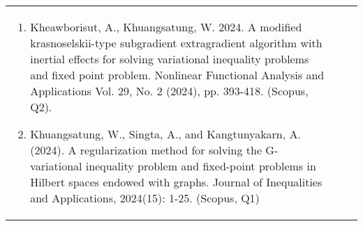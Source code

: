 {\begin{center}
\begin{longtable}{|p{}|p{}|p{}|}
\begin{enumerate}[series=note]
	\item Kheawborisut, A., Khuangsatung, W. 2024. A modified krasnoselskii-type subgradient extragradient algorithm with inertial effects for solving variational inequality problems and fixed point problem. Nonlinear Functional Analysis and Applications Vol. 29, No. 2 (2024), pp. 393-418. (Scopus, Q2).
	\item Khuangsatung, W., Singta, A., and Kangtunyakarn, A. (2024). A regularization method for solving the G-variational inequality problem and fixed-point problems in Hilbert spaces endowed with graphs. Journal of Inequalities and Applications, 2024(15): 1-25. (Scopus, Q1) 

\end{enumerate}
\end{longtable}
\end{center}}
